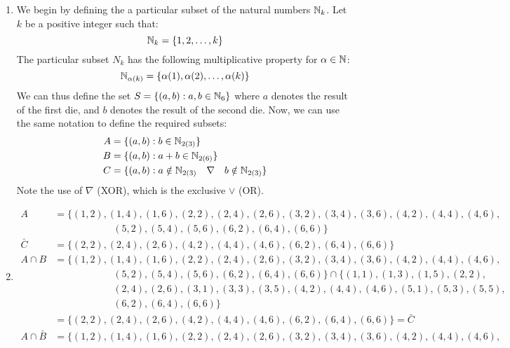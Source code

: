 \documentclass{article}
\begin{document}
	\begin{sol}
		\vspace{-0.6cm}
		\begin{enumerate}[$\quad$a)]
			\item We begin by defining the a particular subset of the natural numbers $\mathbb{N}_k$. Let $k$ be a positive integer such that: $$ \mathbb{N}_k = \{1, 2, \dots, k\} $$
			The particular subset $N_k$ has the following multiplicative property for $\alpha \in \mathbb{N}$:
			$$ \mathbb{N}_{\alpha (k) } = \{ \alpha (1), \alpha(2), \dots, \alpha (k) \}$$
			We can thus define the set $S = \{ (a, b): a, b \in \mathbb{N}_6\}$ where $a$ denotes the result of the first die, and $b$ denotes the result of the second die. Now, we can use the same notation to define the required subsets:
			\begin{align*}
				A &= \{ (a, b) : b \in \mathbb{N}_{2(3)} \}\\
				B &= \{ (a, b) : a+b \in \mathbb{N}_{2(6)} \} \\
				C &= \{ (a, b) : a \notin \mathbb{N}_{2(3)}\quad \nabla \quad  b \notin \mathbb{N}_{2(3)}   \}
			\end{align*}
			Note the use of $\nabla$ (XOR), which is the exclusive $\lor$ (OR).
		\pagebreak
			\item 
			\begin{align*}
				A &= \{ (1, 2), (1, 4), (1, 6), (2, 2), (2, 4), (2, 6), (3, 2), (3, 4), (3, 6), (4, 2), (4, 4), (4, 6), \\
				&\quad\quad\quad\quad\quad\quad (5, 2), (5, 4), (5, 6), (6, 2), (6, 4), (6, 6) \}\\
				\bar{C} &= \{ (2,2), (2,4), (2,6), (4,2), (4,4), (4, 6), (6, 2), (6, 4), (6,6) \} \\
				A \cap B &=\{ (1, 2), (1, 4), (1, 6), (2, 2), (2, 4), (2, 6), (3, 2), (3, 4), (3, 6), (4, 2), (4, 4), (4, 6), \\
				&\quad\quad\quad\quad\quad\quad (5, 2), (5, 4), (5, 6), (6, 2), (6, 4), (6, 6) \} \cap \{ (1,1), (1,3), (1, 5), (2,2), \\
				&\quad\quad\quad\quad\quad\quad (2,4), (2,6), (3, 1), (3, 3), (3, 5), (4, 2), (4, 4), (4, 6), (5, 1), (5, 3), (5,5), \\
				&\quad\quad\quad\quad\quad\quad (6, 2), (6, 4), (6, 6) \}\\
				&= \{ (2,2), (2,4), (2,6), (4,2), (4,4), (4,6), (6,2), (6,4), (6,6) \} = \bar{C} \\
				A \cap \bar{B} &= \{ (1, 2), (1, 4), (1, 6), (2, 2), (2, 4), (2, 6), (3, 2), (3, 4), (3, 6), (4, 2), (4, 4), (4, 6), \\

\end{align*}
\end{enumerate}
\end{sol}
\end{document}
